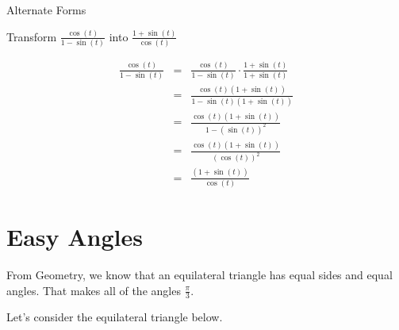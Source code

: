 \documentclass{ximera}
\begin{document}
\begin{example} Alternate Forms


Transform $\frac{\cos(t)}{1 - \sin(t)}$ into $\frac{1 + \sin(t)}{\cos(t)}$



\begin{explanation}

\begin{align*}
\frac{\cos(t)}{1 - \sin(t)}  &  = &  \frac{\cos(t)}{1 - \sin(t)}  \cdot \frac{1 + \sin(t)}{1 + \sin(t)}  \\
                           &  = &  \frac{\cos(t)(1 + \sin(t))}{1 - \sin(t)(1 + \sin(t))}  \\
                           &  = &  \frac{\cos(t)(1 + \sin(t))}{1 - (\sin(t))^2}  \\
                           &  = &  \frac{\cos(t)(1 + \sin(t))}{(\cos(t))^2}  \\
                           &  = &  \frac{(1 + \sin(t))}{\cos(t)}  
\end{align*}



\end{explanation}




\end{example}










\section{Easy Angles}


From Geometry, we know that an equilateral triangle has equal sides and equal angles.  That makes all of the angles $\frac{\pi}{3}$.  

Let's consider the equilateral triangle below.
\end{document}
